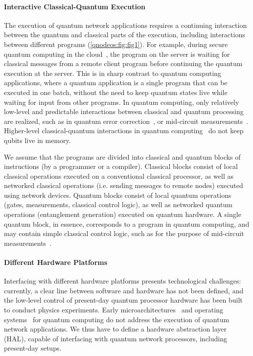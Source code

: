 \paragraph{Interactive Classical-Quantum Execution}
The execution of quantum network applications requires a continuing interaction between the quantum and classical parts of the execution, including interactions between different programs (\cref{qnodeos:fig:fig1}).
For example, during secure quantum computing in the cloud~\cite{broadbent_2009_ubqc,ma_qenclave-practical_2022}, the program on the server is waiting for classical messages from a remote client program before continuing the quantum execution at the server.
This is in sharp contrast to quantum computing applications, where a quantum application is a single program that can be executed in one batch, without the need to keep quantum states live while waiting for input from other programs.
In quantum computing, only relatively low-level and predictable interactions between classical and quantum processing are realized, such as in quantum error correction~\cite{lidar2013quantum}, or mid-circuit measurements~\cite{botelho_error_2022}.
Higher-level classical-quantum interactions in quantum computing~\cite{bharti_noisy_2022} do not keep qubits live in memory.

We assume that the programs are divided into classical and quantum blocks of instructions (by a programmer or a compiler).
Classical blocks consist of local classical operations executed on a conventional classical processor, as well as networked classical operations (i.e. sending messages to remote nodes) executed using network devices.
Quantum blocks consist of local quantum operations (gates, measurements, classical control logic), as well as networked quantum operations (entanglement generation) executed on quantum hardware.
A single quantum block, in essence, corresponds to a program in quantum computing, and may contain simple classical control logic, such as for the purpose of mid-circuit measurements~\cite{botelho_error_2022}.

\paragraph{Different Hardware Platforms}
Interfacing with different hardware platforms presents technological challenges: currently, a clear line between software and hardware has not been defined, and the low-level control of present-day quantum processor hardware has been built to conduct physics experiments.
Early microarchitectures~\cite{bertels_quantum_2020,fu_2019_eqasm} and operating systems~\cite{giortamis_qos_2024,kong_2021_origin} for quantum computing do not address the execution of quantum network applications.
We thus have to define a hardware abstraction layer (HAL), capable of interfacing with quantum network processors, including present-day setups. 


